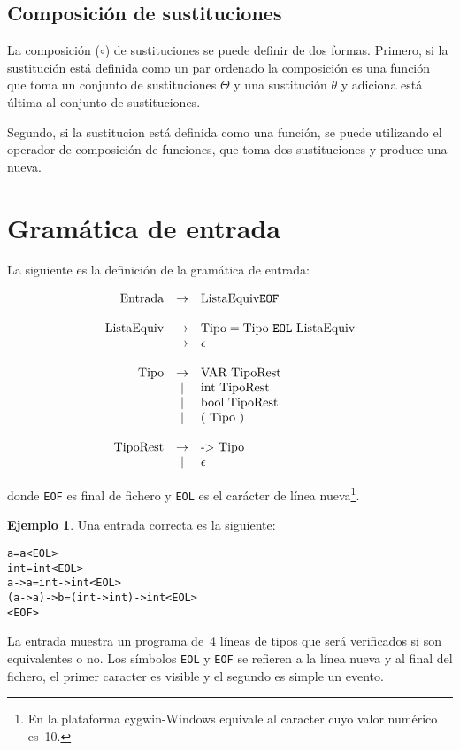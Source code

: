 \documentclass{article}
\theoremstyle{definition}
\newtheorem{example}{Ejemplo}[section]
\begin{document}
\subsection{Composición de sustituciones}
\label{sec:compsus}

La composición ($\circ$) de sustituciones se puede definir de dos
formas. Primero, si la sustitución está definida como un par ordenado
la composición es una función que toma un conjunto de sustituciones
$\Theta$ y una sustitución $\theta$ y adiciona está última al conjunto
de sustituciones.

Segundo, si la sustitucion está definida como una
función, se puede utilizando el operador de composición de funciones,
que toma dos sustituciones y produce una nueva.

\section{Gramática de entrada}
\label{sec:gramatica-de-entrada}

La siguiente es la definición de la gramática de entrada:

\[
  \begin{array}[h]{rcl}
    \text{Entrada} & \to  & \text{ListaEquiv} \texttt{EOF}
    \\
    \\
    \text{ListaEquiv} & \to & \text{Tipo} = \text{Tipo}\ \texttt{EOL}\
                              \text{ListaEquiv}
    \\
                   & \to & \epsilon
    \\
    \\
    \text{Tipo}    & \to & \text{VAR}\  \text{TipoRest}
    \\
                   & \mid & \text{int}\ \text{TipoRest}
    \\
                   & \mid & \text{bool}\ \text{TipoRest}
    \\
                   & \mid & (\ \text{Tipo} \ )
    \\
    \\
    \text{TipoRest} & \to & \text{-$>$}\ \text{Tipo}
    \\
                   & \mid & \epsilon
  \end{array}
\]

donde \texttt{EOF} es final de fichero y \texttt{EOL} es el carácter
de línea nueva\footnote{En la plataforma cygwin-Windows equivale al
  caracter cuyo valor numérico es~10.}.

\begin{example}
Una entrada correcta es la siguiente:

\begin{alltt}
a = a <EOL>
int = int <EOL>
a -> a = int -> int <EOL>
(a -> a) -> b = (int -> int) -> int <EOL>
<EOF>
\end{alltt}

La entrada muestra un programa de~4 líneas de tipos que será
verificados si son equivalentes o no. Los símbolos \texttt{EOL} y
\texttt{EOF} se refieren a la línea nueva y al final del fichero, el
primer caracter es visible y el segundo es simple un evento.
\end{example}
\end{document}
